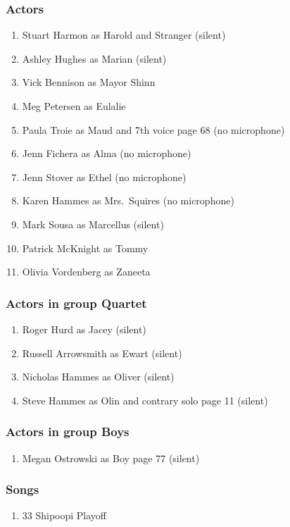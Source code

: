 \subsubsection{Actors}
\begin{enumerate}
\item Stuart Harmon as Harold and Stranger (silent)
\item Ashley Hughes as Marian (silent)
\item Vick Bennison as Mayor Shinn
\item Meg Petersen as Eulalie
\item Paula Troie as Maud and 7th voice page 68 (no microphone)
\item Jenn Fichera as Alma (no microphone)
\item Jenn Stover as Ethel (no microphone)
\item Karen Hammes as Mrs.~Squires (no microphone)
\item Mark Sousa as Marcellus (silent)
\item Patrick McKnight as Tommy
\item Olivia Vordenberg as Zaneeta
\end{enumerate}
\subsubsection{Actors in group Quartet}
\begin{enumerate}
\item Roger Hurd as Jacey (silent)
\item Russell Arrowsmith as Ewart (silent)
\item Nicholas Hammes as Oliver (silent)
\item Steve Hammes as Olin and contrary solo page 11 (silent)
\end{enumerate}
\subsubsection{Actors in group Boys}
\begin{enumerate}
\item Megan Ostrowski as Boy page 77 (silent)
\end{enumerate}

\subsubsection{Songs}
\begin{enumerate}
\item 33 Shipoopi Playoff
\end{enumerate}

